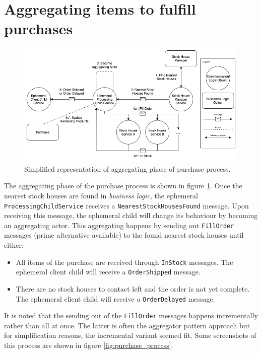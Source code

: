 
\section{Aggregating items to fulfill purchases}
\label{sec:finishing_process}

\begin{figure}[H]
    \centering
    \includegraphics[width=0.8\linewidth]{images/aggr_phase.png}
    \captionsetup{width=0.9\linewidth}
    \captionsetup{justification=centering}
    \caption{Simplified representation of aggregating phase of purchase process.}
    \label{fig:aggr-phase}
\end{figure}

The aggregating phase of the purchase process is shown in figure \ref{fig:aggr-phase}.
Once the nearest stock houses are found in \textit{business logic}, the ephemeral \texttt{Processing\-Child\-Service} receives a \texttt{Nearest\-Stock\-Houses\-Found} message.
Upon receiving this message, the ephemeral child will change its behaviour by becoming an aggregating actor.
This aggregating happens by sending out \texttt{FillOrder} messages (prime alternative available) to the found nearest stock houses until either:
\begin{itemize}
    \item All items of the purchase are received through \texttt{InStock} messages. The ephemeral client child will receive a \texttt{OrderShipped} message.
    \item There are no stock houses to contact left and the order is not yet complete. The ephemeral client child will receive a \texttt{OrderDelayed} message.
\end{itemize}
It is noted that the sending out of the \texttt{FillOrder} messages happens incrementally rather than all at once.
The latter is often the aggregator pattern approach but for simplification reasons, the incremental variant seemed fit.
Some screenshots of this process are shown in figure \ref{fig:purchase_process}.

